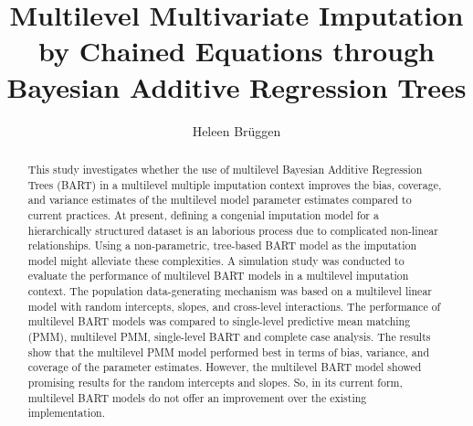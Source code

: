 \documentclass[preprint,12pt]{elsarticle}
\begin{document}
\begin{frontmatter}
  \title{Multilevel Multivariate Imputation by Chained Equations through Bayesian Additive Regression Trees}
  \author{Heleen Brüggen}

  \begin{abstract}
    This study investigates whether the use of multilevel Bayesian Additive Regression Trees (BART) in a multilevel multiple imputation context improves the bias, coverage, and variance estimates of the multilevel model parameter estimates compared to current practices. At present, defining a congenial imputation model for a hierarchically structured dataset is an laborious process due to complicated non-linear relationships. Using a non-parametric, tree-based BART model as the imputation model might alleviate these complexities. A simulation study was conducted to evaluate the performance of multilevel BART models in a multilevel imputation context. The population data-generating mechanism was based on a multilevel linear model with random intercepts, slopes, and cross-level interactions. The performance of multilevel BART models was compared to single-level predictive mean matching (PMM), multilevel PMM, single-level BART and complete case analysis. The results show that the multilevel PMM model performed best in terms of bias, variance, and coverage of the parameter estimates. However, the multilevel BART model showed promising results for the random intercepts and slopes. So, in its current form, multilevel BART models do not offer an improvement over the existing implementation.
  \end{abstract}
\end{frontmatter}

\newpage
\tableofcontents
\newpage
\end{document}
